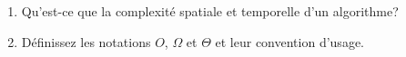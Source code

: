   \begin{enumerate}

    \item Qu'est-ce que la complexité spatiale et temporelle
          d'un algorithme?

    \item Définissez les notations $O$, $\Omega$ et $\Theta$ et leur
          convention d'usage.

  \end{enumerate}
